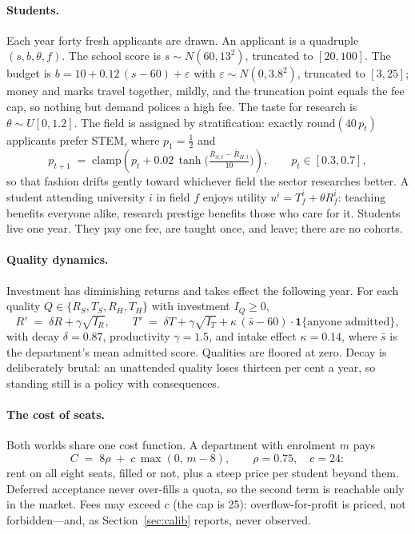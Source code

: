 \documentclass[11pt,a4paper]{article}
\begin{document}
\paragraph{Students.} Each year forty fresh applicants are drawn. An applicant is a quadruple $(s, b, \theta, f)$. The school score is $s \sim N(60, 13^2)$, truncated to $[20,100]$. The budget is $b = 10 + 0.12\,(s - 60) + \varepsilon$ with $\varepsilon \sim N(0, 3.8^2)$, truncated to $[3,25]$; money and marks travel together, mildly, and the truncation point equals the fee cap, so nothing but demand polices a high fee. The taste for research is $\theta \sim U[0, 1.2]$. The field is assigned by stratification: exactly $\mathrm{round}(40\,p_t)$ applicants prefer STEM, where $p_1 = \tfrac12$ and
\[
p_{t+1} \;=\; \mathrm{clamp}\!\left(p_t + 0.02\,\tanh\!\Big(\tfrac{\overline{R}_{S,t} - \overline{R}_{H,t}}{10}\Big)\right)\!,
\qquad p_t \in [0.3, 0.7],
\]
so that fashion drifts gently toward whichever field the sector researches better. A student attending university $i$ in field $f$ enjoys utility $u^i = T_f^i + \theta R_f^i$: teaching benefits everyone alike, research prestige benefits those who care for it. Students live one year. They pay one fee, are taught once, and leave; there are no cohorts.

\paragraph{Quality dynamics.} Investment has diminishing returns and takes effect the following year. For each quality $Q \in \{R_S, T_S, R_H, T_H\}$ with investment $I_Q \ge 0$,
\[
R' \;=\; \delta R + \gamma \sqrt{I_R}, \qquad
T' \;=\; \delta T + \gamma \sqrt{I_T} + \kappa\,(\bar{s} - 60)\cdot\mathbf{1}\{\text{anyone admitted}\},
\]
with decay $\delta = 0.87$, productivity $\gamma = 1.5$, and intake effect $\kappa = 0.14$, where $\bar{s}$ is the department's mean admitted score. Qualities are floored at zero. Decay is deliberately brutal: an unattended quality loses thirteen per cent a year, so standing still is a policy with consequences.

\paragraph{The cost of seats.} Both worlds share one cost function. A department with enrolment $m$ pays
\[
C \;=\; 8\rho \;+\; c\,\max(0,\, m - 8), \qquad \rho = 0.75, \quad c = 24:
\]
rent on all eight seats, filled or not, plus a steep price per student beyond them. Deferred acceptance never over-fills a quota, so the second term is reachable only in the market. Fees may exceed $c$ (the cap is 25): overflow-for-profit is priced, not forbidden---and, as Section~\ref{sec:calib} reports, never observed.
\end{document}
